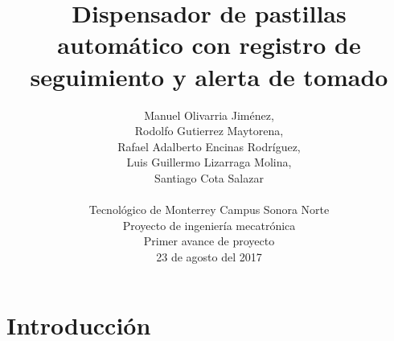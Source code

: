 \documentclass[12pt]{article}
\title{Dispensador de pastillas autom\'atico con registro de seguimiento y alerta de tomado}
\author
{Manuel Olivarria Jim\'enez, \\Rodolfo Gutierrez Maytorena, \\Rafael Adalberto Encinas Rodr\'iguez, \\Luis Guillermo Lizarraga Molina, \\Santiago Cota Salazar\\
\\
\normalsize{Tecnol\'ogico de Monterrey Campus Sonora Norte}\\
\normalsize{Proyecto de ingenier\'ia mecatr\'onica}\\
\normalsize{Primer avance de proyecto}\\
\normalsize{23 de agosto del 2017}
}
\date{}
\newenvironment{sciabstract}{%
\begin{quote} \bf}
{\end{quote}}
\begin{document}
 


\baselineskip24pt


\maketitle 






\section*{Introducci\'on}
\end{document}
